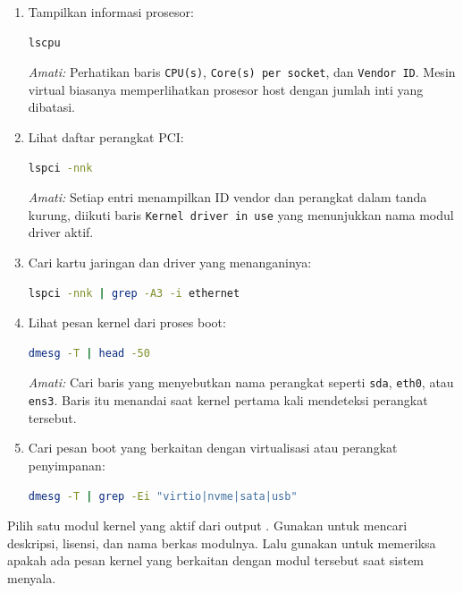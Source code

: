 \begin{enumerate}
    \item Tampilkan informasi prosesor:
\begin{lstlisting}[language=bash, caption={Membaca spesifikasi prosesor}]
lscpu
\end{lstlisting}
    \textit{Amati:} Perhatikan baris \texttt{CPU(s)}, \texttt{Core(s) per socket}, dan \texttt{Vendor ID}. Mesin virtual biasanya memperlihatkan prosesor host dengan jumlah inti yang dibatasi.

    \item Lihat daftar perangkat PCI:
\begin{lstlisting}[language=bash, caption={Daftar perangkat PCI beserta driver aktif}]
lspci -nnk
\end{lstlisting}
    \textit{Amati:} Setiap entri menampilkan ID vendor dan perangkat dalam tanda kurung, diikuti baris \texttt{Kernel driver in use} yang menunjukkan nama modul driver aktif.

    \item Cari kartu jaringan dan driver yang menanganinya:
\begin{lstlisting}[language=bash, caption={Filter informasi kartu jaringan}]
lspci -nnk | grep -A3 -i ethernet
\end{lstlisting}

    \item Lihat pesan kernel dari proses boot:
\begin{lstlisting}[language=bash, caption={Pesan kernel saat boot}]
dmesg -T | head -50
\end{lstlisting}
    \textit{Amati:} Cari baris yang menyebutkan nama perangkat seperti \texttt{sda}, \texttt{eth0}, atau \texttt{ens3}. Baris itu menandai saat kernel pertama kali mendeteksi perangkat tersebut.

    \item Cari pesan boot yang berkaitan dengan virtualisasi atau perangkat penyimpanan:
\begin{lstlisting}[language=bash, caption={Menyaring pesan kernel dengan dmesg}]
dmesg -T | grep -Ei "virtio|nvme|sata|usb"
\end{lstlisting}
\end{enumerate}

\begin{challengebox}
Pilih satu modul kernel yang aktif dari output . Gunakan  untuk mencari deskripsi, lisensi, dan nama berkas modulnya. Lalu gunakan  untuk memeriksa apakah ada pesan kernel yang berkaitan dengan modul tersebut saat sistem menyala.
\end{challengebox}

